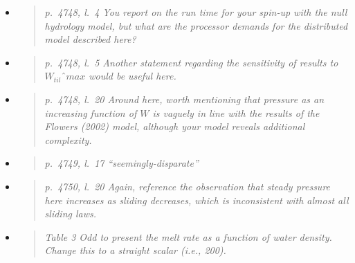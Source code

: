 \documentclass[11pt,reqno]{amsart}
\newcommand{\reply}[2]{
\medskip\medskip
\item  \begin{quote}
\emph{#1}
\end{quote}

\medskip
\noindent #2}
\begin{document}
\begin{itemize}
\reply{p.~4748, l.~4 You report on the run time for your spin-up with the null hydrology model,
but what are the processor demands for the distributed model described here?}
{}

\reply{p.~4748, l.~5 Another statement regarding the sensitivity of results to $W_{til}ˆ{max}$ would
be useful here.}
{}

\reply{p.~4748, l.~20 Around here, worth mentioning that pressure as an increasing function of
$W$ is vaguely in line with the results of the Flowers (2002) model, although your model
reveals additional complexity.}
{}

\reply{p.~4749, l.~17 ``seemingly-disparate''}
{}

\reply{p.~4750, l.~20 Again, reference the observation that steady pressure here increases as
sliding decreases, which is inconsistent with almost all sliding laws.}
{}

\reply{Table 3 Odd to present the melt rate as a function of water density. Change this to a
straight scalar (i.e., 200).}
{}
\end{itemize}
\end{document}
